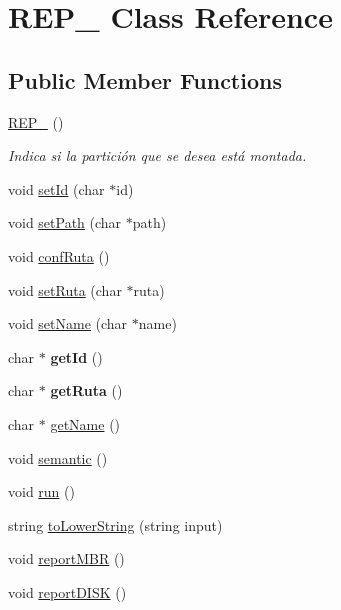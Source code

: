 \hypertarget{classREP__}{}\section{R\+E\+P\+\_\+ Class Reference}
\label{classREP__}
\subsection*{Public Member Functions}
\begin{DoxyCompactItemize}
\item 
\hyperlink{classREP___a067733aa62d5f5cc028fd4de7e2eba3a}{R\+E\+P\+\_\+} ()
\begin{DoxyCompactList}\small\item\em Indica si la partición que se desea está montada. \end{DoxyCompactList}\item 
void \hyperlink{classREP___a42631749f8e85ecee3d125f2db1167f0}{set\+Id} (char $\ast$id)
\item 
void \hyperlink{classREP___aad647454ea8a5ef1d8b962f785af7bb8}{set\+Path} (char $\ast$path)
\item 
void \hyperlink{classREP___ac10352477beb170b15096cf13c559935}{conf\+Ruta} ()
\item 
void \hyperlink{classREP___a6e13e906980b5ee0d3eb87021f3b73b9}{set\+Ruta} (char $\ast$ruta)
\item 
void \hyperlink{classREP___ad66a2155dafd5a9ca0cec161e42ddd3e}{set\+Name} (char $\ast$name)
\item 
\mbox{\label{classREP___ab5c3e45ded785eaeac191f6ecbf8b042}} 
char $\ast$ {\bfseries get\+Id} ()
\item 
\mbox{\label{classREP___aa5303ed9e76c35cb81e751dea99389c5}} 
char $\ast$ {\bfseries get\+Ruta} ()
\item 
char $\ast$ \hyperlink{classREP___a9d4e00566ad8a08662f06e97265e059d}{get\+Name} ()
\item 
void \hyperlink{classREP___a7b6a615bdcab7164cddb336a4b0ef1b7}{semantic} ()
\item 
void \hyperlink{classREP___abe74de18a398b8f428e868a316bcec58}{run} ()
\item 
string \hyperlink{classREP___ae1d0fa6e478eac36a3246d73e574b9f2}{to\+Lower\+String} (string input)
\item 
void \hyperlink{classREP___aa1f6945c91d9494c42a0c34338a83790}{report\+M\+BR} ()
\item 
void \hyperlink{classREP___aa0429938785e2c916b3c89148a4d7317}{report\+D\+I\+SK} ()
\end{DoxyCompactItemize}


